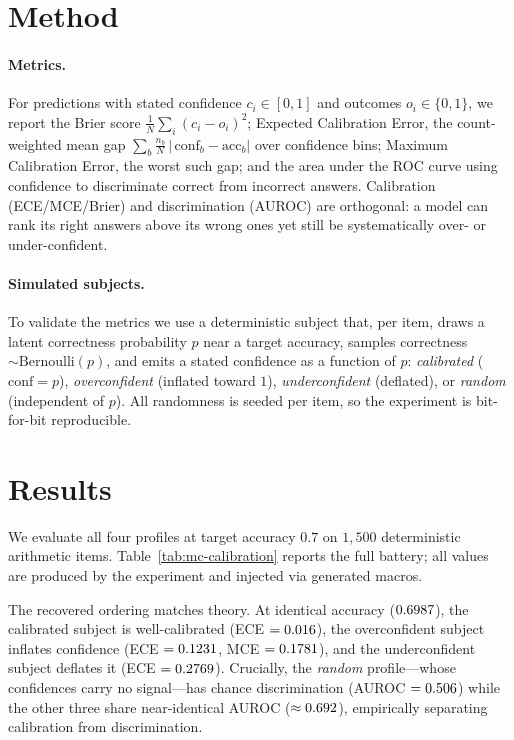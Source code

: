 \documentclass{article}
\begin{document}
\section{Method}
\paragraph{Metrics.} For predictions with stated confidence $c_i \in [0,1]$ and outcomes
$o_i \in \{0,1\}$, we report the Brier score $\frac{1}{N}\sum_i (c_i - o_i)^2$; Expected
Calibration Error, the count-weighted mean gap $\sum_b \frac{n_b}{N}\,|\,\text{conf}_b -
\text{acc}_b|$ over confidence bins; Maximum Calibration Error, the worst such gap; and
the area under the ROC curve using confidence to discriminate correct from incorrect
answers. Calibration (ECE/MCE/Brier) and discrimination (AUROC) are orthogonal: a model
can rank its right answers above its wrong ones yet still be systematically over- or
under-confident.

\paragraph{Simulated subjects.} To validate the metrics we use a deterministic subject
that, per item, draws a latent correctness probability $p$ near a target accuracy, samples
correctness $\sim\text{Bernoulli}(p)$, and emits a stated confidence as a function of $p$:
\emph{calibrated} ($\text{conf}=p$), \emph{overconfident} (inflated toward $1$),
\emph{underconfident} (deflated), or \emph{random} (independent of $p$). All randomness is
seeded per item, so the experiment is bit-for-bit reproducible.

\section{Results}
We evaluate all four profiles at target accuracy $0.7$ on $1{,}500$ deterministic
arithmetic items. Table~\ref{tab:mc-calibration} reports the full battery; all values are
produced by the experiment and injected via generated macros.



The recovered ordering matches theory. At identical accuracy ($0.6987$),
the calibrated subject is well-calibrated (ECE $=0.016$), the overconfident
subject inflates confidence (ECE $=0.1231$, MCE $=0.1781$), and
the underconfident subject deflates it (ECE $=0.2769$). Crucially, the
\emph{random} profile---whose confidences carry no signal---has chance discrimination
(AUROC $=0.506$) while the other three share near-identical AUROC
($\approx 0.692$), empirically separating calibration from discrimination.
\end{document}
